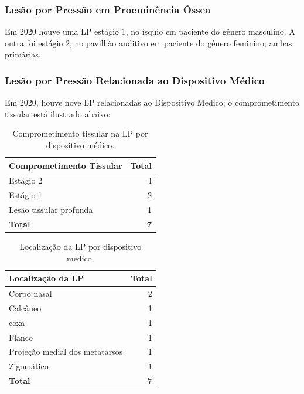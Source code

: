 \documentclass[
  a4paper]{article}
\begin{document}
\subsubsection{Lesão por Pressão em Proeminência Óssea}

\hspace{1cm} Em 2020 houve uma LP estágio 1, no ísquio em paciente do
gênero masculino. A outra foi estágio 2, no pavilhão auditivo em
paciente do gênero feminino; ambas primárias.

\subsubsection{Lesão por Pressão Relacionada ao Dispositivo Médico}

\hspace{1cm} Em 2020, houve nove LP relacionadas ao Dispositivo Médico;
o comprometimento tissular está ilustrado abaixo:

\begin{table}[H]

\caption{\label{tab:unnamed-chunk-10}Comprometimento tissular na LP por dispositivo médico.}
\centering
\begin{tabular}[t]{lr}
\toprule
Comprometimento Tissular & Total\\
\midrule
Estágio 2 & 4\\
Estágio 1 & 2\\
Lesão tissular profunda & 1\\
\midrule
\textbf{Total} & \textbf{7}\\
\bottomrule
\end{tabular}
\end{table}

\begin{table}[H]

\caption{\label{tab:unnamed-chunk-11}Localização da LP por dispositivo médico.}
\centering
\begin{tabular}[t]{lr}
\toprule
Localização da LP & Total\\
\midrule
Corpo nasal & 2\\
Calcâneo & 1\\
coxa & 1\\
Flanco & 1\\
Projeção medial dos metatarsos & 1\\
\addlinespace
Zigomático & 1\\
\midrule
\textbf{Total} & \textbf{7}\\
\bottomrule
\end{tabular}
\end{table}
\end{document}
